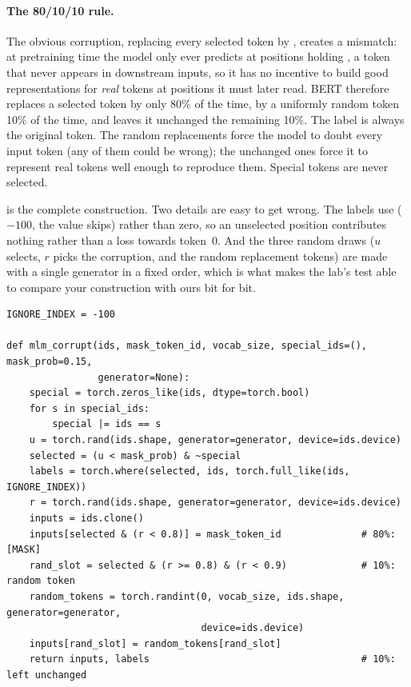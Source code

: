 \paragraph{The 80/10/10 rule.} The obvious corruption, replacing every selected token by
\code{[MASK]}, creates a mismatch: at pretraining time the model only ever predicts at positions
holding \code{[MASK]}, a token that never appears in downstream inputs, so it has no incentive to
build good representations for \emph{real} tokens at positions it must later read. BERT therefore
replaces a selected token by \code{[MASK]} only 80\% of the time, by a uniformly random token 10\% of
the time, and leaves it unchanged the remaining 10\%. The label is always the original token.
The random replacements force the model to doubt every input token (any of them could be wrong); the
unchanged ones force it to represent real tokens well enough to reproduce them. Special tokens are
never selected.

 is the complete construction. Two details are easy to get wrong. The labels
use  ($-100$, the value  skips) rather than zero, so an
unselected position contributes nothing rather than a loss towards token~0. And the three random draws
($u$ selects, $r$ picks the corruption, and the random replacement tokens) are made with a single
generator in a fixed order, which is what makes the lab's test able to compare your construction
with ours bit for bit.

\begin{lstlisting}[caption={BERT's masked-token targets (from \ident{llmsys/encoder.py}).},label={lst:encoders:mlm}]
IGNORE_INDEX = -100

def mlm_corrupt(ids, mask_token_id, vocab_size, special_ids=(), mask_prob=0.15,
                generator=None):
    special = torch.zeros_like(ids, dtype=torch.bool)
    for s in special_ids:
        special |= ids == s
    u = torch.rand(ids.shape, generator=generator, device=ids.device)
    selected = (u < mask_prob) & ~special
    labels = torch.where(selected, ids, torch.full_like(ids, IGNORE_INDEX))
    r = torch.rand(ids.shape, generator=generator, device=ids.device)
    inputs = ids.clone()
    inputs[selected & (r < 0.8)] = mask_token_id              # 80%: [MASK]
    rand_slot = selected & (r >= 0.8) & (r < 0.9)             # 10%: random token
    random_tokens = torch.randint(0, vocab_size, ids.shape, generator=generator,
                                  device=ids.device)
    inputs[rand_slot] = random_tokens[rand_slot]
    return inputs, labels                                     # 10%: left unchanged
\end{lstlisting}

